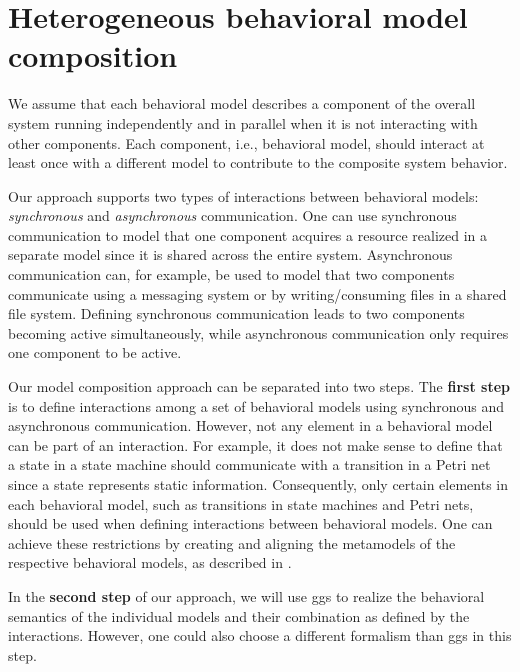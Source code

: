 \documentclass[a4paper]{easychair}
\begin{document}
\section{Heterogeneous behavioral model composition}
We assume that each behavioral model describes a component of the overall system running independently and in parallel when it is not interacting with other components.
Each component, i.e., behavioral model, should interact at least once with a different model to contribute to the composite system behavior.

Our approach supports two types of interactions between behavioral models: \textit{synchronous} and \textit{asynchronous} communication.
One can use synchronous communication to model that one component acquires a resource realized in a separate model since it is shared across the entire system.
Asynchronous communication can, for example, be used to model that two components communicate using a messaging system or by writing/consuming files in a shared file system.
Defining synchronous communication leads to two components becoming active simultaneously, while asynchronous communication only requires one component to be active. 

Our model composition approach can be separated into two steps.
The \textbf{first step} is to define interactions among a set of behavioral models using synchronous and asynchronous communication.
However, not any element in a behavioral model can be part of an interaction.
For example, it does not make sense to define that a state in a state machine should communicate with a transition in a Petri net since a state represents static information.
Consequently, only certain elements in each behavioral model, such as transitions in state machines and Petri nets, should be used when defining interactions between behavioral models.
One can achieve these restrictions by creating and aligning the metamodels of the respective behavioral models, as described in \cite{krauterBehavioralConsistencyHeterogeneous2021}.

In the \textbf{second step} of our approach, we will use \glspl*{gg} to realize the behavioral semantics of the individual models and their combination as defined by the interactions.
However, one could also choose a different formalism than \glspl*{gg} in this step.
\end{document}
